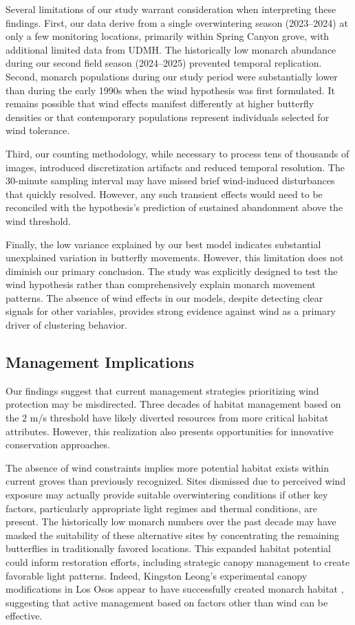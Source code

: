 Several limitations of our study warrant consideration when interpreting these findings. First, our data derive from a single overwintering season (2023--2024) at only a few monitoring locations, primarily within Spring Canyon grove, with additional limited data from UDMH. The historically low monarch abundance during our second field season (2024--2025) prevented temporal replication. Second, monarch populations during our study period were substantially lower than during the early 1990s when the wind hypothesis was first formulated. It remains possible that wind effects manifest differently at higher butterfly densities or that contemporary populations represent individuals selected for wind tolerance.

Third, our counting methodology, while necessary to process tens of thousands of images, introduced discretization artifacts and reduced temporal resolution. The 30-minute sampling interval may have missed brief wind-induced disturbances that quickly resolved. However, any such transient effects would need to be reconciled with the hypothesis's prediction of sustained abandonment above the wind threshold.

Finally, the low variance explained by our best model indicates substantial unexplained variation in butterfly movements. However, this limitation does not diminish our primary conclusion. The study was explicitly designed to test the wind hypothesis rather than comprehensively explain monarch movement patterns. The absence of wind effects in our models, despite detecting clear signals for other variables, provides strong evidence against wind as a primary driver of clustering behavior.

\subsection{Management Implications}

Our findings suggest that current management strategies prioritizing wind protection may be misdirected. Three decades of habitat management based on the 2 m/s threshold have likely diverted resources from more critical habitat attributes. However, this realization also presents opportunities for innovative conservation approaches.

The absence of wind constraints implies more potential habitat exists within current groves than previously recognized. Sites dismissed due to perceived wind exposure may actually provide suitable overwintering conditions if other key factors, particularly appropriate light regimes and thermal conditions, are present. The historically low monarch numbers over the past decade may have masked the suitability of these alternative sites by concentrating the remaining butterflies in traditionally favored locations. This expanded habitat potential could inform restoration efforts, including strategic canopy management to create favorable light patterns. Indeed, Kingston Leong's experimental canopy modifications in Los Osos appear to have successfully created monarch habitat \autocite{kingston_spatial_2016}, suggesting that active management based on factors other than wind can be effective.

